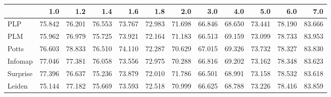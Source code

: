 \begin{tabular}{lrrrrrrrrrrr}
\toprule
{} &    1.0 &    1.2 &    1.4 &    1.6 &    1.8 &    2.0 &    3.0 &    4.0 &    5.0 &    6.0 &    7.0 \\
\midrule
PLP      & 75.842 & 76.201 & 76.553 & 73.767 & 72.983 & 71.698 & 66.846 & 68.650 & 73.441 & 78.190 & 83.666 \\
PLM      & 75.962 & 76.979 & 75.725 & 73.921 & 72.164 & 71.183 & 66.513 & 69.159 & 73.099 & 78.733 & 83.953 \\
Potts    & 76.603 & 78.833 & 76.510 & 74.110 & 72.287 & 70.629 & 67.015 & 69.326 & 73.732 & 78.327 & 83.830 \\
Infomap  & 77.046 & 77.381 & 76.058 & 73.556 & 72.975 & 70.288 & 66.816 & 69.202 & 73.162 & 78.348 & 83.623 \\
Surprise & 77.396 & 76.637 & 75.236 & 73.879 & 72.010 & 71.786 & 66.501 & 68.991 & 73.158 & 78.532 & 83.618 \\
Leiden   & 75.144 & 77.182 & 75.669 & 73.593 & 72.518 & 70.999 & 66.625 & 68.788 & 73.226 & 78.416 & 83.859 \\
\bottomrule
\end{tabular}
